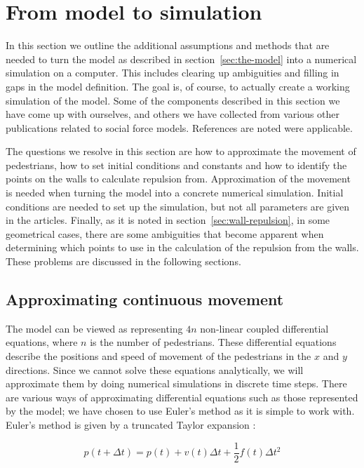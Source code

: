 \section{From model to simulation}
\label{sec:model-to-simulation}
In this section we outline the additional assumptions and methods that are 
needed to turn the model as described in section~\ref{sec:the-model} into a 
numerical simulation on a computer. This includes clearing up ambiguities and 
filling in gaps in the model definition.  The goal is, of course, to actually 
create a working simulation of the model.  Some of the components described in 
this section we have come up with ourselves, and others we have collected from 
various other publications related to social force models. References are 
noted were applicable.

The questions we resolve in this section are how to approximate the movement 
of pedestrians, how to set initial conditions and constants and how to 
identify the points on the walls to calculate repulsion from. Approximation of 
the movement is needed when turning the model into a concrete numerical 
simulation. Initial conditions are needed to set up the simulation, but not 
all parameters are given in the articles. Finally, as it is noted in 
section~\ref{sec:wall-repulsion}, in some geometrical cases, there are some 
ambiguities that become apparent when determining which points to use in the 
calculation of the repulsion from the walls. These problems are discussed in 
the following sections.

\subsection{Approximating continuous movement}
\label{sec:continuous-movement}
The model can be viewed as representing $4n$ non-linear coupled differential 
equations, where $n$ is the number of pedestrians. These differential 
equations describe the positions and speed of movement of the pedestrians in 
the $x$ and $y$ directions. Since we cannot solve these equations 
analytically, we will approximate them by doing numerical simulations in 
discrete time steps. There are various ways of approximating differential 
equations such as those represented by the model; we have chosen to use 
Euler's method as it is simple to work with. Euler's method is given by a 
truncated Taylor expansion \cite{MD}:

\begin{equation}
    p(t+\Delta t)=p(t)+v(t)\Delta t + \frac{1}{2}f(t)\Delta t^2
\end{equation}     


